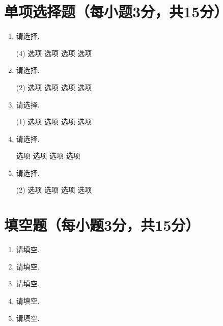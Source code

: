 \documentclass[oneside,AutoFakeBold=2.85]{cjluexam}
\begin{document}
\maketitle

\section{单项选择题（每小题3分，共15分）}

\begin{enumerate}[topsep=8pt,itemsep=4pt]
  \item
    请选择\Fill{}.
    \begin{tasks}(4)
      \task 选项
      \task 选项
      \task 选项
      \task 选项
    \end{tasks}
  \item
    请选择\Fill{}.
    \begin{tasks}(2)
      \task 选项
      \task 选项
      \task 选项
      \task 选项
    \end{tasks}
  \item
    请选择\Fill{}.
    \begin{tasks}(1)
      \task 选项
      \task 选项
      \task 选项
      \task 选项
    \end{tasks}
  \item
    请选择\Fill{}.
    \begin{tasks}
      \task 选项
      \task 选项
      \task 选项
      \task 选项
    \end{tasks}
  \item
    请选择\Fill{}.
    \begin{tasks}(2)
      \task 选项
      \task 选项
      \task 选项
      \task 选项
    \end{tasks}
\end{enumerate}

\clearpage

\section{填空题（每小题3分，共15分）}

\begin{enumerate}[topsep=8pt, itemsep=4pt]
  \item
    请填空\Fill[8em]{}.
  \item
    请填空\Fill[8em]{}.
  \item
    请填空\Fill[8em]{}.
  \item
    请填空\Fill[8em]{}.
  \item
    请填空\Fill[8em]{}.
\end{enumerate}
\end{document}
